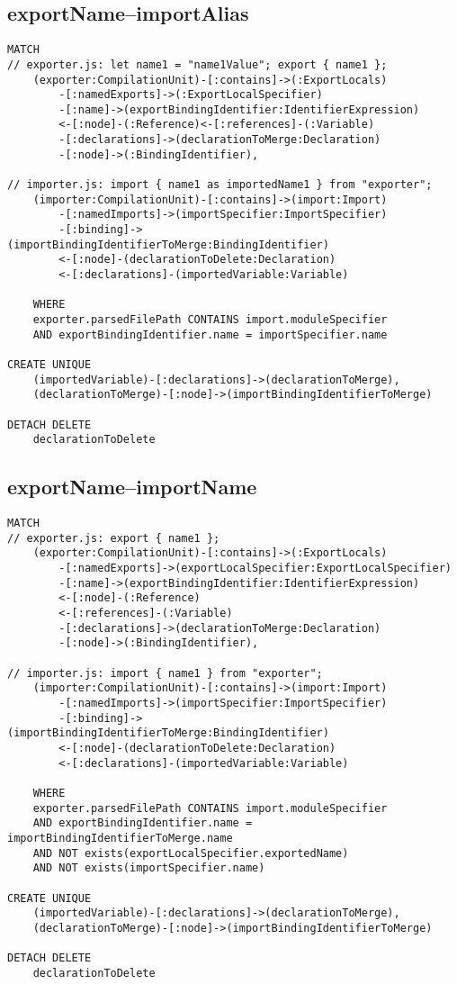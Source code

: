 \newpage
\subsection{exportName–importAlias}
\begin{lstlisting}[language=Cypher]
MATCH
// exporter.js: let name1 = "name1Value"; export { name1 };
    (exporter:CompilationUnit)-[:contains]->(:ExportLocals)
        -[:namedExports]->(:ExportLocalSpecifier)
        -[:name]->(exportBindingIdentifier:IdentifierExpression)
        <-[:node]-(:Reference)<-[:references]-(:Variable)
        -[:declarations]->(declarationToMerge:Declaration)
        -[:node]->(:BindingIdentifier),

// importer.js: import { name1 as importedName1 } from "exporter";
    (importer:CompilationUnit)-[:contains]->(import:Import)
        -[:namedImports]->(importSpecifier:ImportSpecifier)
        -[:binding]->(importBindingIdentifierToMerge:BindingIdentifier)
        <-[:node]-(declarationToDelete:Declaration)
        <-[:declarations]-(importedVariable:Variable)

    WHERE
    exporter.parsedFilePath CONTAINS import.moduleSpecifier
    AND exportBindingIdentifier.name = importSpecifier.name

CREATE UNIQUE
    (importedVariable)-[:declarations]->(declarationToMerge),
    (declarationToMerge)-[:node]->(importBindingIdentifierToMerge)

DETACH DELETE
    declarationToDelete
\end{lstlisting}

\newpage
\subsection{exportName–importName}
\begin{lstlisting}[language=Cypher]
MATCH
// exporter.js: export { name1 };
    (exporter:CompilationUnit)-[:contains]->(:ExportLocals)
        -[:namedExports]->(exportLocalSpecifier:ExportLocalSpecifier)
        -[:name]->(exportBindingIdentifier:IdentifierExpression)
        <-[:node]-(:Reference)
        <-[:references]-(:Variable)
        -[:declarations]->(declarationToMerge:Declaration)
        -[:node]->(:BindingIdentifier),

// importer.js: import { name1 } from "exporter";
    (importer:CompilationUnit)-[:contains]->(import:Import)
        -[:namedImports]->(importSpecifier:ImportSpecifier)
        -[:binding]->(importBindingIdentifierToMerge:BindingIdentifier)
        <-[:node]-(declarationToDelete:Declaration)
        <-[:declarations]-(importedVariable:Variable)

    WHERE
    exporter.parsedFilePath CONTAINS import.moduleSpecifier
    AND exportBindingIdentifier.name = importBindingIdentifierToMerge.name
    AND NOT exists(exportLocalSpecifier.exportedName)
    AND NOT exists(importSpecifier.name)

CREATE UNIQUE
    (importedVariable)-[:declarations]->(declarationToMerge),
    (declarationToMerge)-[:node]->(importBindingIdentifierToMerge)

DETACH DELETE
    declarationToDelete
\end{lstlisting}